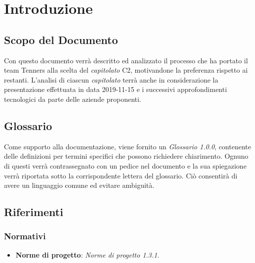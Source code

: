 \section{Introduzione}

\subsection{Scopo del Documento}
Con questo documento verrà descritto ed analizzato il processo che ha portato il team Tenners alla scelta del \textit{capitolato\glo} C2, motivandone la preferenza rispetto ai restanti. L'analisi di ciascun \textit{capitolato\glo} terrà anche in considerazione la presentazione effettuata in data 2019-11-15 e i successivi approfondimenti tecnologici da parte delle aziende proponenti.
	
\subsection{Glossario}
Come supporto alla documentazione, viene fornito un \textit{Glossario 1.0.0\docs}, contenente delle definizioni per termini specifici che possono richiedere chiarimento. Ognuno di questi verrà contrassegnato con un pedice \glo nel documento e la sua spiegazione verrà riportata sotto la corrispondente lettera del glossario. Ciò consentirà di avere un linguaggio comune ed evitare ambiguità. 
	
\subsection{Riferimenti}
\subsubsection{Normativi}
\begin{itemize}
	\item \textbf{Norme di progetto}: \textit{Norme di progetto 1.3.1\docs}.
\end{itemize}

